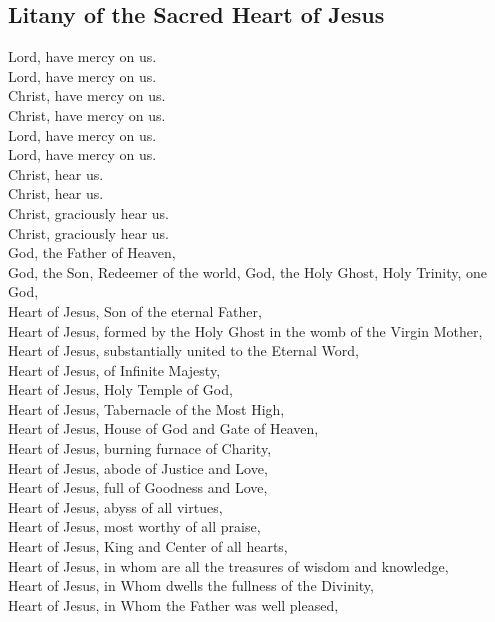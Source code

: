 \documentclass[statementpaper, 11pt]{memoir}
\begin{document}

\subsection{Litany of the Sacred Heart of Jesus}

Lord, have mercy on us.\\
Lord, have mercy on us.\\
Christ, have mercy on us.\\
Christ, have mercy on us.\\
Lord, have mercy on us.\\
Lord, have mercy on us.\\
Christ, hear us.\\
Christ, hear us.\\
Christ, graciously hear us.\\
Christ, graciously hear us.\\
God, the Father of Heaven,\\
God, the Son, Redeemer of the world, God, the Holy Ghost, Holy Trinity, one God,\\
Heart of Jesus, Son of the eternal Father,\\
Heart of Jesus, formed by the Holy Ghost in the womb of the Virgin Mother,\\
Heart of Jesus, substantially united to the Eternal Word,\\
Heart of Jesus, of Infinite Majesty,\\
Heart of Jesus, Holy Temple of God,\\
Heart of Jesus, Tabernacle of the Most High,\\
Heart of Jesus, House of God and Gate of Heaven,\\
Heart of Jesus, burning furnace of Charity,\\
Heart of Jesus, abode of Justice and Love,\\
Heart of Jesus, full of Goodness and Love,\\
Heart of Jesus, abyss of all virtues,\\
Heart of Jesus, most worthy of all praise,\\
Heart of Jesus, King and Center of all hearts,\\
Heart of Jesus, in whom are all the treasures of wisdom and knowledge,\\
Heart of Jesus, in Whom dwells the fullness of the Divinity,\\
Heart of Jesus, in Whom the Father was well pleased,\\
\end{document}
